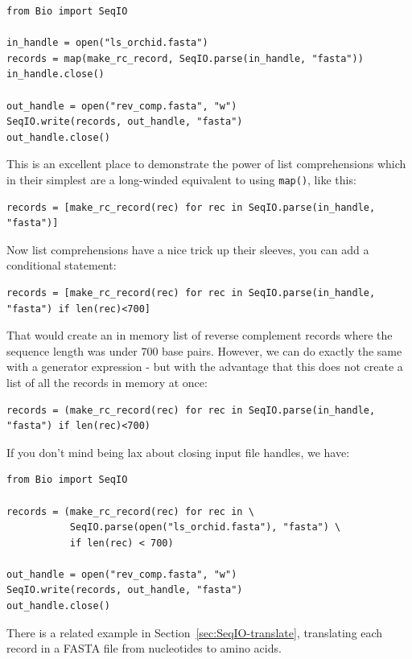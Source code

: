 \documentclass{report}
\begin{document}
\begin{verbatim}
from Bio import SeqIO

in_handle = open("ls_orchid.fasta")
records = map(make_rc_record, SeqIO.parse(in_handle, "fasta"))
in_handle.close()

out_handle = open("rev_comp.fasta", "w")
SeqIO.write(records, out_handle, "fasta")
out_handle.close()
\end{verbatim}

This is an excellent place to demonstrate the power of list comprehensions which in their simplest are a long-winded equivalent to using \verb|map()|, like this:

\begin{verbatim}
records = [make_rc_record(rec) for rec in SeqIO.parse(in_handle, "fasta")]
\end{verbatim}

\noindent Now list comprehensions have a nice trick up their sleeves, you can add a conditional statement:

\begin{verbatim}
records = [make_rc_record(rec) for rec in SeqIO.parse(in_handle, "fasta") if len(rec)<700]
\end{verbatim}

That would create an in memory list of reverse complement records where the sequence length was under 700 base pairs. However, we can do exactly the same with a generator expression - but with the advantage that this does not create a list of all the records in memory at once:

\begin{verbatim}
records = (make_rc_record(rec) for rec in SeqIO.parse(in_handle, "fasta") if len(rec)<700)
\end{verbatim}

If you don't mind being lax about closing input file handles, we have:

\begin{verbatim}
from Bio import SeqIO

records = (make_rc_record(rec) for rec in \
           SeqIO.parse(open("ls_orchid.fasta"), "fasta") \
           if len(rec) < 700)

out_handle = open("rev_comp.fasta", "w")
SeqIO.write(records, out_handle, "fasta")
out_handle.close()
\end{verbatim}

There is a related example in Section~\ref{sec:SeqIO-translate}, translating each
record in a FASTA file from nucleotides to amino acids.
\end{document}
